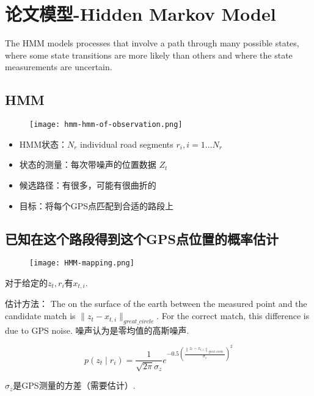 \section{论文模型-Hidden Markov Model}

The HMM models processes that involve a path through many
possible states, where some state transitions are more likely than
others and where the state measurements are uncertain.

\subsection{HMM}

\begin{figure}[h]
    \centering
    \texttt{[image: hmm-hmm-of-observation.png]}
\end{figure}

\begin{itemize}
    \item HMM状态：$ N_{r} $ individual  road  segments $ r_{i},  i=1 \ldots N_{r} $
    \item 状态的测量：每次带噪声的位置数据 $ Z_{t} $
    \item 候选路径：有很多，可能有很曲折的
    \item 目标：将每个GPS点匹配到合适的路段上
\end{itemize}

\subsection{已知在这个路段得到这个GPS点位置的概率估计}

\begin{figure}[h]
    \centering
    \texttt{[image: HMM-mapping.png]}
\end{figure}

对于给定的$z_{t},r_{i} $有$ x_{t, i}$. 

估计方法：
The  on the surface of the earth between the measured point and the candidate match is $ \| z_{t}- x_{t, i} \|_{great\_circle}$. For the correct match, this difference is due to GPS noise. 噪声认为是零均值的高斯噪声. 

$$ p\left(z_{t} \mid r_{i}\right)=\frac{1}{\sqrt{2 \pi} \sigma_{z}} e^{-0.5\left(\frac{\left\|z_{t}-x_{t, i}\right\|_{\text {great circle }}}{\sigma_{z}}\right)^{2}} $$

$\sigma_{z}$是GPS测量的方差（需要估计）. 


